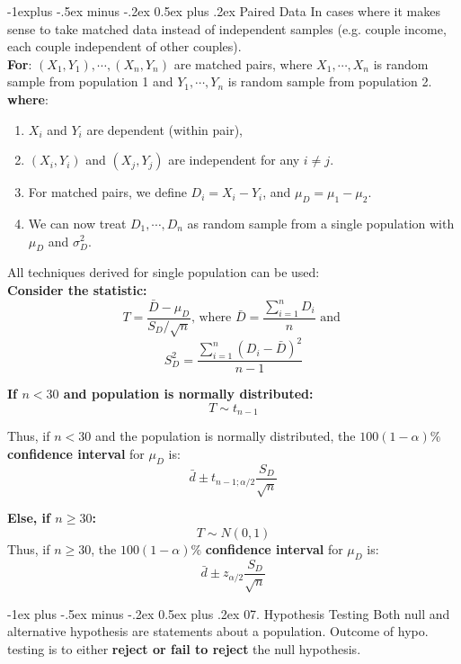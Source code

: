 \documentclass[12pt, landscape]{article}
\makeatletter
\renewcommand{\section}{\@startsection{section}{1}{0mm}%
                                {-1ex plus -.5ex minus -.2ex}%
                                {0.5ex plus .2ex}%
                                {\normalfont\large\bfseries}}
\renewcommand{\subsection}{\@startsection{subsection}{2}{0.1mm}%
                                {-1explus -.5ex minus -.2ex}%
                                {0.5ex plus .2ex}%
                                {\normalfont\normalsize\bfseries}}
\makeatother
\begin{document}
\begin{multicols*}{3}
\subsection{Paired Data}
In cases where it makes sense to take matched data instead of independent samples (e.g. couple income, each couple independent of other couples).
\\ \smallskip
\textbf{For}: $(X_1, Y_1), \cdots, (X_n, Y_n)$ are matched pairs, where $X_1, \cdots, X_n$ is random sample from population 1 and $Y_1, \cdots, Y_n$ is random sample from population 2.
\\ \smallskip
 \textbf{where}:
\smallskip
\begin{enumerate}
    \item $X_i$ and $Y_i$ are dependent (within pair),
    \item $(X_i, Y_i)$ and $(X_j, Y_j)$ are independent for any $i \neq j$.
    \item For matched pairs, we define $D_i = X_i - Y_i$, and  $\mu_D = \mu_1 - \mu_2$.
    \item We can now treat $D_1, \cdots, D_n$ as random sample from a single population with $\mu_D$ and $\sigma_D^2$. 
\end{enumerate}
\smallskip
All techniques derived for single population can be used:
\medskip
\\ \textbf{Consider the statistic:}
\[T = \frac{\bar{D} - \mu_D}{S_D / \sqrt{n}} \text{, where } \bar{D} = \frac{\sum _{i=1} ^n D_i}{n} \text{ and }\]
\smallskip
\[S_D^2 = \frac{\sum _{i=1} ^n (D_i - \bar{D})^2}{n-1}\]
\smallskip

\textbf{If $n < 30$ and population is normally distributed:}
\[T \sim t_{n-1}\]

\smallskip
Thus, if $n < 30$ and the population is normally distributed, the \textbf{$100(1-\alpha)\%$ confidence interval} for $\mu_D$ is:
\[\bar{d} \pm t_{n-1; \alpha/2} \frac{S_D}{\sqrt{n}}\]


\medskip
\textbf{Else, if $n \geq 30$:}
\[T \sim N(0,1)\]
Thus, if $n \geq 30$, the $100(1-\alpha)\%$ \textbf{confidence interval} for $\mu_D$ is:
\[\bar{d} \pm z_{\alpha/2} \frac{S_D}{\sqrt{n}}\]


\vfill \null
\columnbreak


\section{07. Hypothesis Testing}
Both null and alternative hypothesis are statements about a population. Outcome of hypo. testing is to either \textbf{reject or fail to reject} the null hypothesis.


\end{multicols*}
\end{document}
